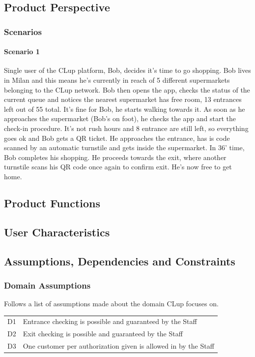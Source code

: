 \subsection{\sffamily Product Perspective}
\subsubsection{\sffamily Scenarios}
\paragraph{Scenario 1}

Single user of the CLup platform, Bob, decides it's time to go shopping.
Bob lives in Milan and this means he's currently in reach of 5 different supermarkets belonging to the CLup network. \newline
Bob then opens the app, checks the status of the current queue and notices the nearest supermarket has free room, 13 entrances left out of 55 total. It's fine for Bob, he starts walking towards it. \newline
As soon as he approaches the supermarket (Bob's on foot), he checks the app and start the check-in procedure. It's not rush hours and 8 entrance are still left, so everything goes ok and Bob gets a QR ticket. He approaches the entrance, has is code scanned by an automatic turnstile and gets inside the supermarket.\newline
In 36' time, Bob completes his shopping. He proceeds towards the exit, where another turnstile scans his QR code once again to confirm exit. He's now free to get home.

\subsection{Product Functions}

\subsection{User Characteristics}

\subsection{Assumptions, Dependencies and Constraints}
\subsubsection{Domain Assumptions}
Follows a list of assumptions made about the domain CLup focuses on.\newline\newline
\begin{tabular}{l|l}
	D1 & Entrance checking is possible and guaranteed by the Staff\\
	D2 & Exit checking is possible and guaranteed by the Staff\\
	D3 & One customer per authorization given is allowed in by the Staff\\
	
\end{tabular}
